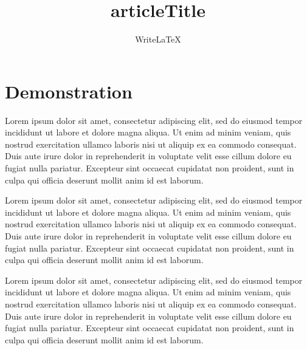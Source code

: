 \documentclass[a4paper]{article}
\begin{document}
\title{articleTitle}
\author{WriteLaTeX}
\maketitle

\section{Demonstration}

Lorem ipsum dolor sit amet, consectetur adipiscing elit, sed do eiusmod tempor incididunt ut labore et dolore magna aliqua. Ut enim ad minim veniam, quis nostrud exercitation ullamco laboris nisi ut aliquip ex ea commodo consequat. \autocite{Ful83} Duis aute irure dolor in reprehenderit in voluptate velit esse cillum dolore eu fugiat nulla pariatur. Excepteur sint occaecat cupidatat non proident, sunt in culpa qui officia deserunt mollit anim id est laborum. \autocite{GMP81}

Lorem ipsum dolor sit amet, consectetur adipiscing elit, sed do eiusmod tempor incididunt ut labore et dolore magna aliqua. \autocite{GMP81} Ut enim ad minim veniam, quis nostrud exercitation ullamco laboris nisi ut aliquip ex ea commodo consequat.  Duis aute irure dolor in reprehenderit in voluptate velit esse cillum dolore eu fugiat nulla pariatur. Excepteur sint occaecat cupidatat non proident, sunt in culpa qui officia deserunt mollit anim id est laborum.

Lorem ipsum dolor sit amet, consectetur adipiscing elit, sed do eiusmod tempor incididunt ut labore et dolore magna aliqua. Ut enim ad minim veniam, quis nostrud exercitation ullamco laboris nisi ut aliquip ex ea commodo consequat. \autocite{Pat85} Duis aute irure dolor in reprehenderit in voluptate velit esse cillum dolore eu fugiat nulla pariatur. \autocite{PP98,PP95} Excepteur sint occaecat cupidatat non proident, sunt in culpa qui officia deserunt mollit anim id est laborum.

\printbibliography
\end{document}
